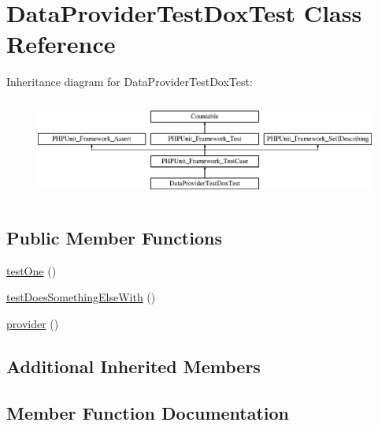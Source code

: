 \hypertarget{class_data_provider_test_dox_test}{}\section{Data\+Provider\+Test\+Dox\+Test Class Reference}
\label{class_data_provider_test_dox_test}
Inheritance diagram for Data\+Provider\+Test\+Dox\+Test\+:\begin{figure}[H]
\begin{center}
\leavevmode
\includegraphics[height=3.303835cm]{class_data_provider_test_dox_test}
\end{center}
\end{figure}
\subsection*{Public Member Functions}
\begin{DoxyCompactItemize}
\item 
\mbox{\hyperlink{class_data_provider_test_dox_test_afbf3ff88b322c6a7197ce02297cd23a0}{test\+One}} ()
\item 
\mbox{\hyperlink{class_data_provider_test_dox_test_a29f464c709d52136a505b1d5d47d3b0d}{test\+Does\+Something\+Else\+With}} ()
\item 
\mbox{\hyperlink{class_data_provider_test_dox_test_a141540808e5970d27589425027e66cc9}{provider}} ()
\end{DoxyCompactItemize}
\subsection*{Additional Inherited Members}


\subsection{Member Function Documentation}
\mbox{\label{class_data_provider_test_dox_test_a141540808e5970d27589425027e66cc9}} 
